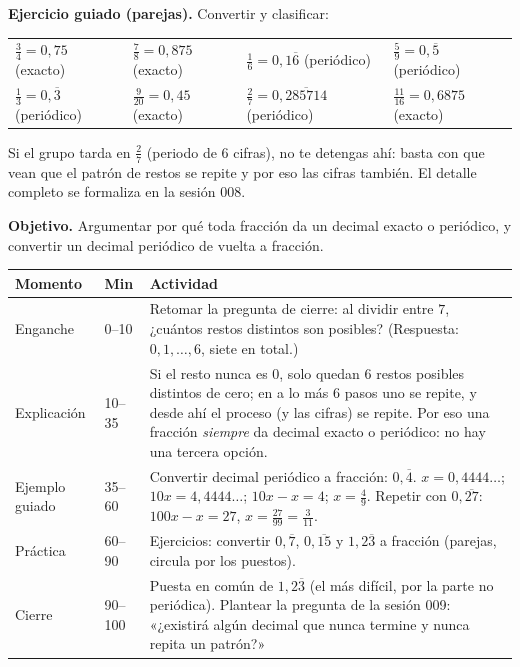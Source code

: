 \documentclass[11pt]{article}
\begin{document}
\textbf{Ejercicio guiado (parejas).} Convertir y clasificar:
\begin{center}
\begin{tabular}{@{}llll@{}}
  $\frac{3}{4} = 0{,}75$ (exacto) &
  $\frac{7}{8} = 0{,}875$ (exacto) &
  $\frac{1}{6} = 0{,}1\overline{6}$ (periódico) &
  $\frac{5}{9} = 0{,}\overline{5}$ (periódico)\\[4pt]
  $\frac{1}{3} = 0{,}\overline{3}$ (periódico) &
  $\frac{9}{20} = 0{,}45$ (exacto) &
  $\frac{2}{7} = 0{,}\overline{285714}$ (periódico) &
  $\frac{11}{16} = 0{,}6875$ (exacto)
\end{tabular}
\end{center}

\begin{nota}
Si el grupo tarda en $\frac{2}{7}$ (periodo de 6 cifras), no te detengas ahí: basta con que
vean que el patrón de restos se repite y por eso las cifras también. El detalle completo se
formaliza en la sesión 008.
\end{nota}


\textbf{Objetivo.} Argumentar por qué toda fracción da un decimal exacto o periódico, y
convertir un decimal periódico de vuelta a fracción.

\begin{center}
{\renewcommand{\arraystretch}{1.3}
\begin{tabularx}{\linewidth}{@{}l l X@{}}
  \toprule
  \textbf{Momento} & \textbf{Min} & \textbf{Actividad}\\
  \midrule
  Enganche & 0–10 & Retomar la pregunta de cierre: al dividir entre $7$, ¿cuántos restos
    distintos son posibles? (Respuesta: $0,1,\ldots,6$, siete en total.)\\
  Explicación & 10–35 & Si el resto nunca es $0$, solo quedan $6$ restos posibles distintos
    de cero; en a lo más $6$ pasos uno se repite, y desde ahí el proceso (y las cifras) se
    repite. Por eso una fracción \emph{siempre} da decimal exacto o periódico: no hay una
    tercera opción.\\
  Ejemplo guiado & 35–60 & Convertir decimal periódico a fracción: $0{,}\overline{4}$.
    $x = 0{,}4444\ldots$; $10x = 4{,}4444\ldots$; $10x - x = 4$; $x = \frac{4}{9}$. Repetir
    con $0{,}\overline{27}$: $100x - x = 27$, $x = \frac{27}{99} = \frac{3}{11}$.\\
  Práctica & 60–90 & Ejercicios: convertir $0{,}\overline{7}$, $0{,}\overline{15}$ y
    $1{,}2\overline{3}$ a fracción (parejas, circula por los puestos).\\
  Cierre & 90–100 & Puesta en común de $1{,}2\overline{3}$ (el más difícil, por la parte no
    periódica). Plantear la pregunta de la sesión 009: «¿existirá algún decimal que nunca
    termine y nunca repita un patrón?»\\
  \bottomrule
\end{tabularx}}
\end{center}
\end{document}
